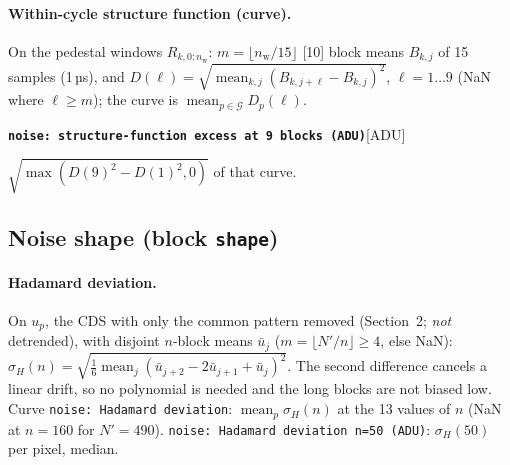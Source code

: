 \documentclass[10pt]{article}
\newcommand{\code}[1]{\texttt{#1}}
\newcommand{\feat}[2]{\par\medskip\noindent\textbf{\texttt{#1}}\hfill{\small [#2]}\par\nopagebreak\smallskip}
\newcommand{\mean}{\operatorname*{mean}}
\newcommand{\nw}{n_\text{w}}
\newcommand{\G}{\mathcal G}
\begin{document}
\paragraph{Within-cycle structure function (curve).} On the pedestal windows $R_{k,0:\nw}$: $m = \lfloor\nw/15\rfloor$ [10] block means
$B_{k,j}$ of 15 samples (1\,µs), and
$D(\ell) = \sqrt{\mean_{k,j}(B_{k,j+\ell} - B_{k,j})^2}$, $\ell = 1\dots9$ (NaN where $\ell \ge m$); the curve is $\mean_{p\in\G}D_p(\ell)$.
\feat{noise: structure-function excess at 9 blocks (ADU)}{ADU}
$\sqrt{\max(D(9)^2 - D(1)^2, 0)}$ of that curve.

\subsection{Noise shape (block \code{shape})}

\paragraph{Hadamard deviation.} On $u_p$, the CDS with only the common pattern removed (Section~2; \emph{not} detrended), with disjoint
$n$-block means $\bar u_j$ ($m = \lfloor N'/n\rfloor \ge 4$, else NaN):
$\sigma_H(n) = \sqrt{\tfrac16\mean_j(\bar u_{j+2} - 2\bar u_{j+1} + \bar u_j)^2}$. The second difference cancels a linear drift, so no
polynomial is needed and the long blocks are not biased low. Curve \code{noise: Hadamard deviation}: $\mean_p\sigma_H(n)$ at the 13 values
of $n$ (NaN at $n = 160$ for $N' = 490$). \code{noise: Hadamard deviation n=50 (ADU)}: $\sigma_H(50)$ per pixel, median.
\end{document}
